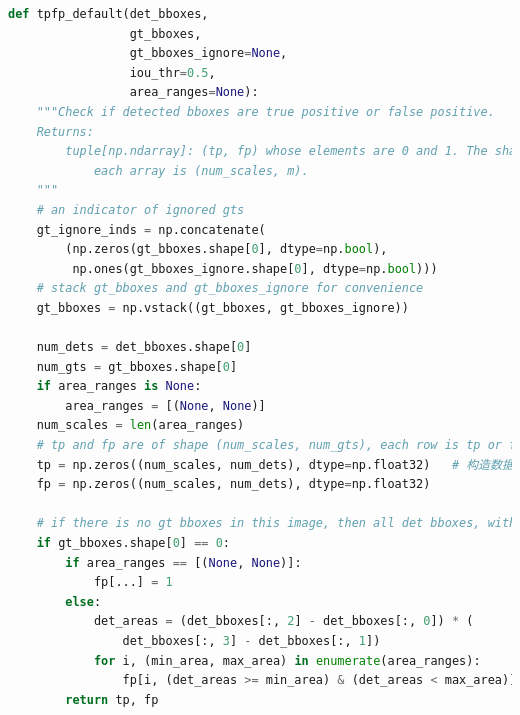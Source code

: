 \documentclass[UTF8]{ctexart}
\begin{document}
\lstset{style=mystyle}
\begin{lstlisting}[language=Python]
def tpfp_default(det_bboxes,
                 gt_bboxes,
                 gt_bboxes_ignore=None,
                 iou_thr=0.5,
                 area_ranges=None):
    """Check if detected bboxes are true positive or false positive.
    Returns:
        tuple[np.ndarray]: (tp, fp) whose elements are 0 and 1. The shape of
            each array is (num_scales, m).
    """
    # an indicator of ignored gts
    gt_ignore_inds = np.concatenate(
        (np.zeros(gt_bboxes.shape[0], dtype=np.bool),
         np.ones(gt_bboxes_ignore.shape[0], dtype=np.bool)))
    # stack gt_bboxes and gt_bboxes_ignore for convenience
    gt_bboxes = np.vstack((gt_bboxes, gt_bboxes_ignore))

    num_dets = det_bboxes.shape[0]
    num_gts = gt_bboxes.shape[0]
    if area_ranges is None:
        area_ranges = [(None, None)]
    num_scales = len(area_ranges)
    # tp and fp are of shape (num_scales, num_gts), each row is tp or fp of a certain scale
    tp = np.zeros((num_scales, num_dets), dtype=np.float32)   # 构造数据mask
    fp = np.zeros((num_scales, num_dets), dtype=np.float32)

    # if there is no gt bboxes in this image, then all det bboxes, within area range are false positives
    if gt_bboxes.shape[0] == 0:
        if area_ranges == [(None, None)]:
            fp[...] = 1
        else:
            det_areas = (det_bboxes[:, 2] - det_bboxes[:, 0]) * (
                det_bboxes[:, 3] - det_bboxes[:, 1])
            for i, (min_area, max_area) in enumerate(area_ranges):
                fp[i, (det_areas >= min_area) & (det_areas < max_area)] = 1
        return tp, fp


\end{lstlisting}
\end{document}
